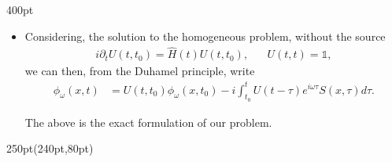\begin{frame}
\begin{textblock*}{400pt}
\begin{itemize}
\item Considering, the solution to the homogeneous problem,
	without the source
\begin{align}
 i\partial_t U(t,t_0) = 
	\hat{H}(t) U(t,t_0),  \hspace{20pt} U(t,t) = \mathds{1},
\end{align}
\noindent we can then, from the Duhamel principle, write
\begin{align}
	\phi_\omega(x,t) & = U(t,t_0)\phi_\omega(x,t_0)
	  -i\int_{t_0}^tU(t-\tau)e^{i\omega \tau}S(x,\tau)d\tau. \label{eqn:duhamel}
\end{align}

The above is the exact formulation of our problem.

\end{itemize}
\end{textblock*}


\begin{textblock*}{250pt}(240pt,80pt)
\end{textblock*}

\end{frame}


